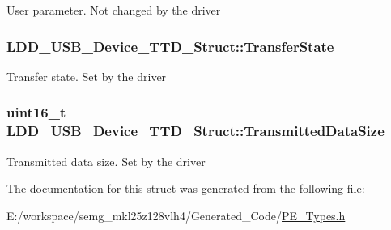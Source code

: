 User parameter. Not changed by the driver \hypertarget{struct_l_d_d___u_s_b___device___t_t_d___struct_aca23e3743f56dc73206b79f885e9130f}{
\subsubsection[{Transfer\-State}]{ L\-D\-D\-\_\-\-U\-S\-B\-\_\-\-Device\-\_\-\-T\-T\-D\-\_\-\-Struct\-::\-Transfer\-State}}\label{struct_l_d_d___u_s_b___device___t_t_d___struct_aca23e3743f56dc73206b79f885e9130f}
Transfer state. Set by the driver \hypertarget{struct_l_d_d___u_s_b___device___t_t_d___struct_aeffbf1300fce5fc9ebf98f5760a96d38}{
\subsubsection[{Transmitted\-Data\-Size}]{\setlength{\rightskip}{0pt plus 5cm}uint16\-\_\-t L\-D\-D\-\_\-\-U\-S\-B\-\_\-\-Device\-\_\-\-T\-T\-D\-\_\-\-Struct\-::\-Transmitted\-Data\-Size}}\label{struct_l_d_d___u_s_b___device___t_t_d___struct_aeffbf1300fce5fc9ebf98f5760a96d38}
Transmitted data size. Set by the driver 

The documentation for this struct was generated from the following file\-:\begin{DoxyCompactItemize}
\item 
E\-:/workspace/semg\-\_\-mkl25z128vlh4/\-Generated\-\_\-\-Code/\hyperlink{_p_e___types_8h}{P\-E\-\_\-\-Types.\-h}\end{DoxyCompactItemize}

